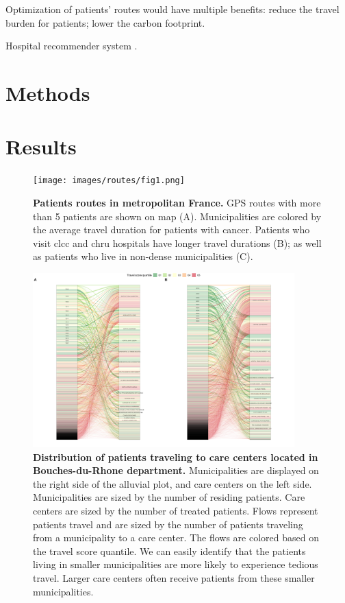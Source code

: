 Optimization of patients' routes would have multiple benefits: reduce the travel burden for patients; lower the carbon footprint.

Hospital recommender system \cite{zhang_idoctor_2017,han_hybrid_2018,narducci_recommender_2015,hoens_reliable_2010,tran_recommender_2021}.

\section{Methods}

\section{Results}

\begin{figure}[H]
    \texttt{[image: images/routes/fig1.png]}
    \centering
    \caption{
        \textbf{Patients routes in metropolitan France.} GPS routes with more than 5 patients are shown on map (A). Municipalities are colored by the average travel duration for patients with cancer. Patients who visit \ac{clcc} and \ac{chru} hospitals have longer travel durations (B); as well as patients who live in non-dense municipalities (C).
    }
    \label{fig:routes-duration-france}
\end{figure}

\begin{figure}[H]
    \includegraphics[width=0.9\textwidth]{images/routes/fig6.png}
    \centering
    \caption{
        \textbf{Distribution of patients traveling to care centers located in Bouches-du-Rhone department.} Municipalities are displayed on the right side of the alluvial plot, and care centers on the left side. Municipalities are sized by the number of residing patients. Care centers are sized by the number of treated patients. Flows represent patients travel and are sized by the number of patients traveling from a municipality to a care center. The flows are colored based on the travel score quantile. We can easily identify that the patients living in smaller municipalities are more likely to experience tedious travel. Larger care centers often receive patients from these smaller municipalities.
    }
    \label{fig:routes-alluvial-13}
\end{figure}

